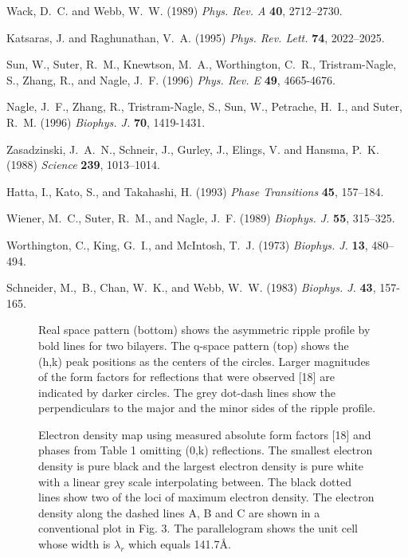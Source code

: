 \begin{thebibliography}{10}
Wack, D.~C. and Webb, W.~W. (1989) {\it Phys. Rev. A} {\bf 40},  2712--2730.

Katsaras, J. and Raghunathan, V.~A. (1995) {\it Phys. Rev. Lett.} {\bf 74}, 
2022--2025.

Sun, W., Suter, R.~M., Knewtson, M.~A., Worthington, C.~R., 
Tristram-Nagle, S., Zhang, R., and Nagle, J.~F.
(1996) {\it Phys. Rev. E} {\bf 49}, 4665-4676.

Nagle, J.~F., Zhang, R., Tristram-Nagle, S., Sun, W., Petrache, H.~I., and
Suter, R.~M. (1996) {\it Biophys. J.} {\bf 70}, 1419-1431.

Zasadzinski, J.~A.~N., Schneir, J., Gurley, J., Elings, V. and Hansma, P.~K. 
(1988) {\it Science} {\bf 239},  1013--1014.

Hatta, I., Kato, S., and Takahashi, H. (1993) {\it Phase Transitions}
{\bf 45},  157--184.

Wiener, M.~C., Suter, R.~M., and Nagle, J.~F. (1989) {\it Biophys. J.}
{\bf 55},  315--325.

Worthington, C., King, G.~I., and McIntosh, T.~J. (1973) {\it Biophys. J.}
{\bf 13}, 480--494.

Schneider, M.,~B., Chan, W.~K., and Webb, W.~W. (1983) 
{\it Biophys. J.} {\bf 43}, 157-165.

\end{thebibliography}

\begin{figure}
\caption{Real space pattern (bottom) shows the asymmetric ripple profile by 
bold lines for two bilayers.  The q-space pattern (top) shows the (h,k) 
peak positions as the centers of the circles.  Larger magnitudes of the 
form factors for reflections that were observed [18] are indicated 
by darker circles.  The grey dot-dash lines show the perpendiculars to the 
major and the minor sides of the ripple profile.
\label{Fig1}}
\end{figure}

\begin{figure}
\caption{Electron density map using measured absolute form factors 
[18] and phases from Table 1 omitting (0,k) reflections.  The smallest 
electron density is pure black and the largest electron density is pure 
white with a linear grey scale interpolating between.  The black dotted 
lines show two of the loci of maximum electron density. The electron 
density along the dashed lines A, B and C are shown in a conventional plot 
in Fig. 3.  The parallelogram shows the unit cell whose width is $\lambda_r$ 
which equals 141.7\AA.
\label{Fig2}}
\end{figure}

